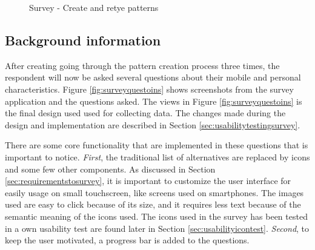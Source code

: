 \begin{figure}[H]
{        \label{fig:retypewrong}
      }
      \caption{Survey - Create and retye patterns}
      \label{fig:createandretypepatterns}
    \end{figure}

  \clearpage 

  \subsection{Background information}
    After creating going through the pattern creation process three times, the respondent will now be asked several questions about their mobile and personal characteristics.
    Figure \ref{fig:surveyquestoins} shows screenshots from the survey application and the questions asked. The views in Figure \ref{fig:surveyquestoins} is the final design used used for collecting data. The changes made during the design and implementation are described in Section \ref{sec:usabilitytestingsurvey}. 

    There are some core functionality that are implemented in these questions that is important to notice. {\it First}, the traditional list of alternatives are replaced by icons and some few other components. As discussed in Section \ref{sec:requirementstosurvey}, it is important to customize the user interface for easily usage on small touchscreen, like screens used on smartphones. The images used are easy to click because of its size, and it requires less text because of the semantic meaning of the icons used. The icons used in the survey has been tested in a own usability test are found later in Section \ref{sec:usabilityicontest}. {\it Second}, to keep the user motivated, a progress bar is added to the questions. 
    
